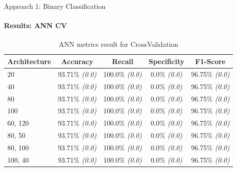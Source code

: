\documentclass[9pt, pstricks, xcolor=dvipsnames]{beamer}
\begin{document}
\begin{frame}{Approach 1: Binary Classification}
	\framesubtitle{Results: ANN CV}

	\begin{table}[h]
		\centering
		\begin{tabular}{lcccc}
			\toprule
			Architecture & Accuracy               & Recall                 & Specificity          & F1-Score               \\
			\midrule
			20           & 93.71\% \textit{(0.0)} & 100.0\% \textit{(0.0)} & 0.0\% \textit{(0.0)} & 96.75\% \textit{(0.0)} \\
			40           & 93.71\% \textit{(0.0)} & 100.0\% \textit{(0.0)} & 0.0\% \textit{(0.0)} & 96.75\% \textit{(0.0)} \\
			80           & 93.71\% \textit{(0.0)} & 100.0\% \textit{(0.0)} & 0.0\% \textit{(0.0)} & 96.75\% \textit{(0.0)} \\
			100          & 93.71\% \textit{(0.0)} & 100.0\% \textit{(0.0)} & 0.0\% \textit{(0.0)} & 96.75\% \textit{(0.0)} \\
			60, 120      & 93.71\% \textit{(0.0)} & 100.0\% \textit{(0.0)} & 0.0\% \textit{(0.0)} & 96.75\% \textit{(0.0)} \\
			80, 50       & 93.71\% \textit{(0.0)} & 100.0\% \textit{(0.0)} & 0.0\% \textit{(0.0)} & 96.75\% \textit{(0.0)} \\
			80, 100      & 93.71\% \textit{(0.0)} & 100.0\% \textit{(0.0)} & 0.0\% \textit{(0.0)} & 96.75\% \textit{(0.0)} \\
			100, 40      & 93.71\% \textit{(0.0)} & 100.0\% \textit{(0.0)} & 0.0\% \textit{(0.0)} & 96.75\% \textit{(0.0)} \\
			\bottomrule
		\end{tabular}
		\caption{ANN metrics result for CrossValidation}
		\label{tab:ann_CV_approach1}
	\end{table}

\end{frame}
\end{document}
